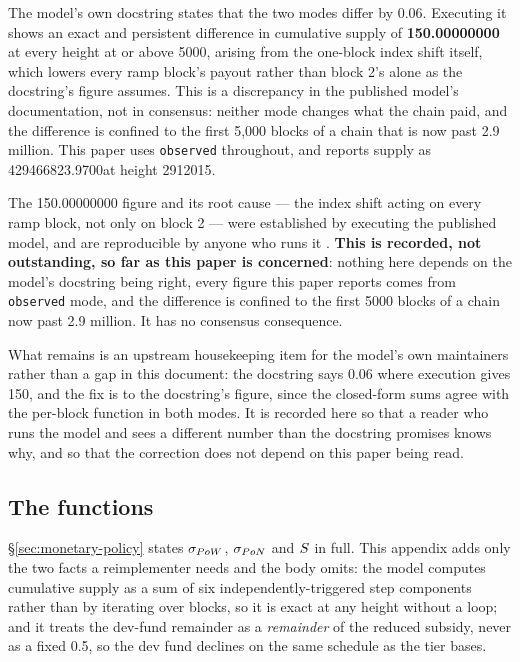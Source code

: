 The model's own docstring states that the two modes differ by \SI{0.06}{\flux}. Executing it shows an
exact and persistent difference in cumulative supply of \textbf{\num{150.00000000}\flux} at every height at or above
\num{5000}, arising from the one-block index shift itself, which lowers every ramp block's payout
rather than block 2's alone as the docstring's figure assumes. This is a
discrepancy in the published model's documentation, not in consensus: neither mode changes what the
chain paid, and the difference is confined to the first 5{,}000 blocks of a chain that is now past
2.9 million. This paper uses \texttt{observed} throughout, and reports supply as
\num{429466823.9700}\flux at height \num{2912015}.

\begin{remark}
\label{rem:emission-discrepancy}
The \num{150.00000000}\flux{} figure and its root cause --- the index shift acting on every ramp
block, not only on block 2 --- were established by executing the published model, and are
reproducible by anyone who runs it \shipped
{}
. \textbf{This is
recorded, not outstanding, so far as this paper is concerned}: nothing here depends on the model's
docstring being right, every figure this paper reports comes from \texttt{observed} mode, and the
difference is confined to the first \num{5000} blocks of a chain now past \num{2.9} million. It has
no consensus consequence.

What remains is an upstream housekeeping item for the model's own maintainers rather than a gap in
this document: the docstring says \SI{0.06}{\flux} where execution gives \num{150}\flux, and the fix
is to the docstring's figure, since the closed-form sums agree with the per-block function in both
modes. It is recorded here so that a reader who runs the model and
sees a different number than the docstring promises knows why, and so that the correction does not
depend on this paper being read.
\end{remark}

\subsection{The functions}

\S\ref{sec:monetary-policy} states $\sigma_{PoW}$, $\sigma_{PoN}$ and $S$ in full. This appendix
adds only the two facts a reimplementer needs and the body omits: the model computes cumulative
supply as a sum of six independently-triggered step components rather than by iterating over blocks,
so it is exact at any height without a loop; and it treats the dev-fund remainder as a
\emph{remainder} of the reduced subsidy, never as a fixed \SI{0.5}{\flux}, so the dev fund declines
on the same schedule as the tier bases.

